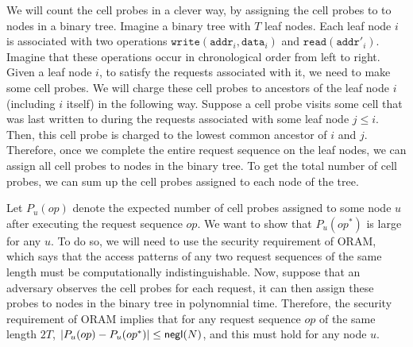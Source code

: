 We will count the cell probes in a clever way, by assigning
the cell probes to 
to nodes in a binary tree. 
Imagine a binary tree with $T$ leaf nodes.
Each leaf node $i$ is associated with two operations
$\texttt{write}(\texttt{addr}_i, \texttt{data}_i)$
and $\texttt{read}(\texttt{addr}'_i)$.
Imagine that these operations 
occur in chronological order from left to right. 
Given a leaf node $i$, 
to satisfy the requests associated with it,
we need to make some cell probes.
We will charge these cell probes 
to ancestors of the leaf node $i$ (including $i$ itself) in the following way. 
Suppose a cell probe  
visits some cell that was last  
written to during the 
requests associated with some leaf node $j \leq i$.
Then, this cell probe is charged to the 
lowest common 
ancestor of $i$ and $j$.
Therefore, once we complete the entire request sequence
on the leaf nodes, we can assign all cell probes
to nodes in the binary tree.
To get the total number of cell probes, we can sum
up the cell probes assigned to each node of the tree.


Let $P_u(op)$ denote the expected number 
of cell probes assigned to 
some node $u$ after executing the request sequence $op$.
We want to show that $P_u(op^*)$ is large for any $u$.
To do so, we will need to use the security requirement of ORAM,
 which says that the access patterns
of any two request sequences of the same length
must be computationally indistinguishable.
Now, suppose that an adversary 
observes the cell probes
for each request, it  
can then assign these probes to nodes in the binary tree 
in polynomnial time.
Therefore, 
the security requirement of ORAM implies
that for any 
request sequence $op$ of the same length $2T$,
$|P_{u}(op) - 
P_{u}(op^*)| \leq {\sf negl}(N)$,
and this must hold for any node $u$.



